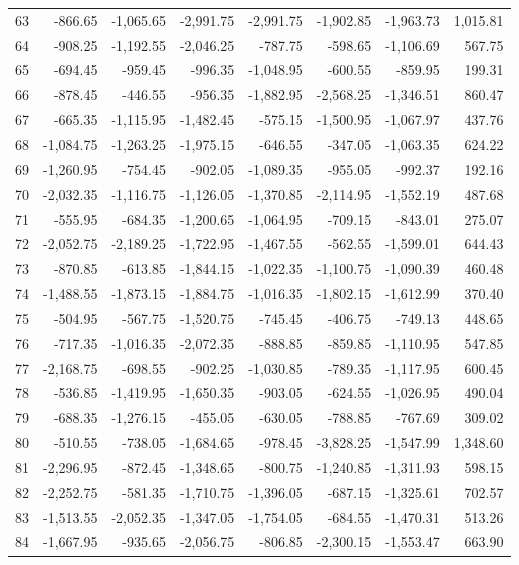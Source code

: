 \begin{longtable}{rrrrrrrr}
63 & -866.65 & -1,065.65 & -2,991.75 & -2,991.75 & -1,902.85 & -1,963.73 & 1,015.81  \\
64 & -908.25 & -1,192.55 & -2,046.25 & -787.75 & -598.65 & -1,106.69 & 567.75  \\
65 & -694.45 & -959.45 & -996.35 & -1,048.95 & -600.55 & -859.95 & 199.31  \\
66 & -878.45 & -446.55 & -956.35 & -1,882.95 & -2,568.25 & -1,346.51 & 860.47  \\
67 & -665.35 & -1,115.95 & -1,482.45 & -575.15 & -1,500.95 & -1,067.97 & 437.76  \\
68 & -1,084.75 & -1,263.25 & -1,975.15 & -646.55 & -347.05 & -1,063.35 & 624.22  \\
69 & -1,260.95 & -754.45 & -902.05 & -1,089.35 & -955.05 & -992.37 & 192.16  \\
70 & -2,032.35 & -1,116.75 & -1,126.05 & -1,370.85 & -2,114.95 & -1,552.19 & 487.68  \\
71 & -555.95 & -684.35 & -1,200.65 & -1,064.95 & -709.15 & -843.01 & 275.07  \\
72 & -2,052.75 & -2,189.25 & -1,722.95 & -1,467.55 & -562.55 & -1,599.01 & 644.43  \\
73 & -870.85 & -613.85 & -1,844.15 & -1,022.35 & -1,100.75 & -1,090.39 & 460.48  \\
74 & -1,488.55 & -1,873.15 & -1,884.75 & -1,016.35 & -1,802.15 & -1,612.99 & 370.40  \\
75 & -504.95 & -567.75 & -1,520.75 & -745.45 & -406.75 & -749.13 & 448.65  \\
76 & -717.35 & -1,016.35 & -2,072.35 & -888.85 & -859.85 & -1,110.95 & 547.85  \\
77 & -2,168.75 & -698.55 & -902.25 & -1,030.85 & -789.35 & -1,117.95 & 600.45  \\
78 & -536.85 & -1,419.95 & -1,650.35 & -903.05 & -624.55 & -1,026.95 & 490.04  \\
79 & -688.35 & -1,276.15 & -455.05 & -630.05 & -788.85 & -767.69 & 309.02  \\
80 & -510.55 & -738.05 & -1,684.65 & -978.45 & -3,828.25 & -1,547.99 & 1,348.60  \\
81 & -2,296.95 & -872.45 & -1,348.65 & -800.75 & -1,240.85 & -1,311.93 & 598.15  \\
82 & -2,252.75 & -581.35 & -1,710.75 & -1,396.05 & -687.15 & -1,325.61 & 702.57  \\
83 & -1,513.55 & -2,052.35 & -1,347.05 & -1,754.05 & -684.55 & -1,470.31 & 513.26  \\
84 & -1,667.95 & -935.65 & -2,056.75 & -806.85 & -2,300.15 & -1,553.47 & 663.90  \\

\end{longtable}
